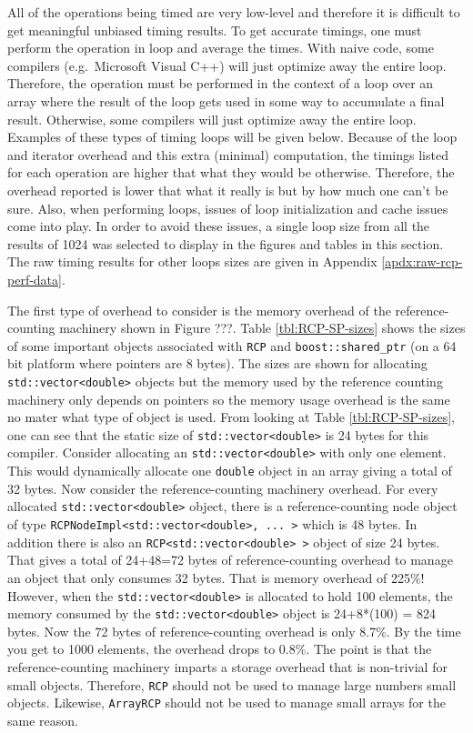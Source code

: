 \documentclass[pdf,ps2pdf,11pt]{SANDreport}
\begin{document}
All of the operations being timed are very low-level and therefore it
is difficult to get meaningful unbiased timing results.  To get
accurate timings, one must perform the operation in loop and average
the times.  With naive code, some compilers (e.g.\ Microsoft Visual
C++) will just optimize away the entire loop.  Therefore, the
operation must be performed in the context of a loop over an array
where the result of the loop gets used in some way to accumulate a
final result.  Otherwise, some compilers will just optimize away the
entire loop.  Examples of these types of timing loops will be given
below.  Because of the loop and iterator overhead and this extra
(minimal) computation, the timings listed for each operation are
higher that what they would be otherwise.  Therefore, the overhead
reported is lower that what it really is but by how much one can't be
sure.  Also, when performing loops, issues of loop initialization and
cache issues come into play.  In order to avoid these issues, a single
loop size from all the results of 1024 was selected to display in the
figures and tables in this section.  The raw timing results for other
loops sizes are given in Appendix {}\ref{apdx:raw-rcp-perf-data}.

The first type of overhead to consider is the memory overhead of the
reference-counting machinery shown in Figure ???.  Table
{}\ref{tbl:RCP-SP-sizes} shows the sizes of some important objects
associated with {}\texttt{RCP} and {}\texttt{boost::shared\_ptr} (on a
64 bit platform where pointers are 8 bytes).  The sizes are shown for
allocating {}\texttt{std::vector<double>} objects but the memory used
by the reference counting machinery only depends on pointers so the
memory usage overhead is the same no mater what type of object is
used.  From looking at Table {}\ref{tbl:RCP-SP-sizes}, one can see that
the static size of {}\texttt{std::vector<double>} is 24 bytes for this
compiler.  Consider allocating an {}\texttt{std::vector<double>} with
only one element.  This would dynamically allocate one
{}\texttt{double} object in an array giving a total of 32 bytes.  Now
consider the reference-counting machinery overhead.  For every
allocated {}\texttt{std::vector<double>} object, there is a
reference-counting node object of type
{}\texttt{RCPNodeImpl<std::vector<double>, ... >} which is 48 bytes.
In addition there is also an {}\texttt{RCP<std::vector<double> >}
object of size 24 bytes.  That gives a total of 24+48=72 bytes of
reference-counting overhead to manage an object that only consumes 32
bytes.  That is memory overhead of 225\%!  However, when the
{}\texttt{std::vector<double>} is allocated to hold 100 elements, the
memory consumed by the {}\texttt{std::vector<double>} object is
24+8*(100) = 824 bytes.  Now the 72 bytes of reference-counting
overhead is only 8.7\%.  By the time you get to 1000 elements, the
overhead drops to 0.8\%.  The point is that the reference-counting
machinery imparts a storage overhead that is non-trivial for small
objects.  Therefore, {}\texttt{RCP} should not be used to manage large
numbers small objects.  Likewise, {}\texttt{ArrayRCP} should not be
used to manage small arrays for the same reason.
\end{document}

